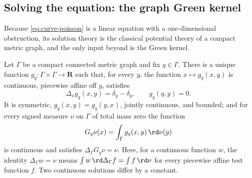 \subsection{Solving the equation: the graph Green kernel}
\label{sec:ch31-curve-green}

Because \eqref{eq:curve-poisson} is a linear equation with a
one-dimensional obstruction, its solution theory is the classical potential
theory of a compact metric graph, and the only input beyond
 is the Green kernel.

\begin{lemma}
\label{lem:ch31-green-kernel}
Let $\Gamma$ be a compact connected metric graph and fix $q\in\Gamma$.
There is a unique function $g_q:\Gamma\times\Gamma\to\mathbf R$ such that,
for every $y$, the function $x\mapsto g_q(x,y)$ is continuous, piecewise
affine off $y$, satisfies
\begin{equation}
\label{eq:ch31-green-kernel}
 \Delta_xg_q(x,y)=\delta_y-\delta_q,
 \qquad g_q(q,y)=0 .
\end{equation}
It is symmetric, $g_q(x,y)=g_q(y,x)$, jointly continuous, and bounded;
and for every signed measure $\nu$ on $\Gamma$ of total mass zero the
function
\begin{equation}
\label{eq:ch31-green-potential}
 G_q\nu(x)=\int_\Gamma g_q(x,y)\,\rd\nu(y)
\end{equation}
is continuous and satisfies $\Delta_\Gamma G_q\nu=\nu$.  Here, for a
continuous function $w$, the identity $\Delta_\Gamma w=\nu$ means
$\int w\,\rd\Delta_\Gamma f=\int f\,\rd\nu$ for every piecewise affine
test function $f$.  Two continuous solutions differ by a constant.
\end{lemma}

